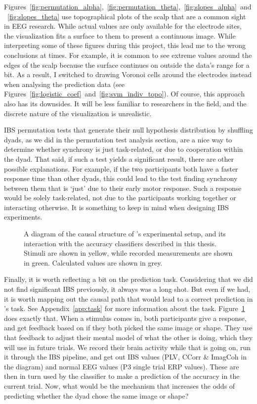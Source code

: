 Figures~\ref{fig:permutation_alpha},~\ref{fig:permutation_theta},~\ref{fig:slopes_alpha}~and~\ref{fig:slopes_theta}
use topographical plots of the scalp that are a common sight in EEG research.
While actual values are only available for the electrode sites, the visualization
fits a surface to them to present a continuous image. While interpreting some of
these figures during this project, this lead me to the wrong conclusions at
times. For example, it is common to see extreme values around the edges of the
scalp because the surface continues on outside the data's range for a bit. As a
result, I switched to drawing Voronoi cells around the electrodes instead when
analysing the prediction data (see
Figures~\ref{fig:logistic_coef}~and~\ref{fig:svm_indiv_topo}). Of course, this
approach also has its downsides. It will be less familiar to researchers in the
field, and the discrete nature of the visualization is unrealistic.

IBS permutation tests that generate their null hypothesis distribution by
shuffling dyads, as we did in the permutation test analysis section, are a nice
way to determine whether synchrony is just task-related, or due to cooperation
within the dyad. That said, if such a test yields a significant result, there
are other possible explanations. For example, if the two participants both have
a faster response time than other dyads, this could lead to the test finding
synchrony between them that is `just' due to their early motor response. Such a
response would be solely task-related, not due to the participants working
together or interacting otherwise. It is something to keep in mind when
designing IBS experiments.

\begin{figure}[!htpb]
  \resizebox{\linewidth}{!}{}
  \caption{A diagram of the causal structure of \textcite{newman_effects_2021}'s experimental setup, and its interaction with the accuracy classifiers described in this thesis. Stimuli are shown in yellow, while recorded measurements are shown in green. Calculated values are shown in grey.}
  \label{fig:causal}
\end{figure}

Finally, it is worth reflecting a bit on the prediction task. Considering that
we did not find significant IBS previously, it always was a long shot. But even
if we had, it is worth mapping out the causal path that would lead to a correct
prediction in \textcite{newman_effects_2021}'s task. See Appendix~\ref{app:task}
for more information about the task. Figure~\ref{fig:causal} does exactly that.
When a stimulus comes in, both participants give a response, and get feedback
based on if they both picked the same image or shape. They use that feedback to
adjust their mental model of what the other is doing, which they will use in
future trials. We record their brain activity while that is going on, run it
through the IBS pipeline, and get out IBS values (PLV, CCorr \& ImagCoh in the
diagram) and normal EEG values (P3 single trial ERP values). These are then in
turn used by the classifier to make a prediction of the accuracy in the current
trial. Now, what would be the mechanism that increases the odds of predicting
whether the dyad chose the same image or shape?

